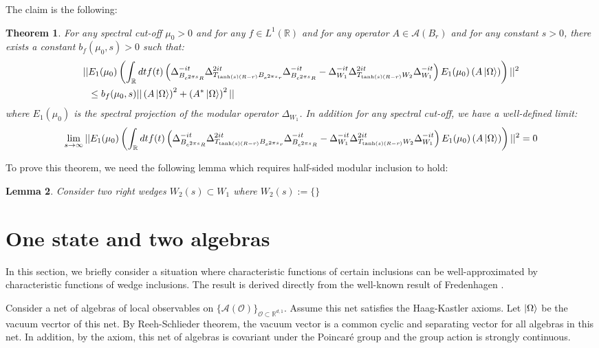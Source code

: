 \documentclass[a4paper,11pt]{article}
\newtheorem{theorem}{Theorem}
\newtheorem{lemma}[theorem]{Lemma}
\theoremstyle{definition}
\newcommand{\lb}{\left(}
\newcommand{\rb}{\right)}
\begin{document}
The claim is the following:
\begin{theorem}
    For any spectral cut-off $\mu_0 > 0$ and for any $f\in L^1(\mathbb{R})$ and for any operator $A\in\mathcal{A}(B_r)$ and for any constant $s > 0$, there exists a constant $b_f(\mu_0, s) >0$ such that:
    \begin{align}
        \begin{split}
            ||&E_1(\mu_0)\lb \int_\mathbb{R} dt f(t)\lb \Delta_{B_{e^{2\pi s}R}}^{-it}\Delta_{T_{\tanh(s)(R-r)}B_{e^{2\pi s}r}}^{2it}\Delta_{B_{e^{2\pi s}R}}^{-it} - \Delta_{W_1}^{-it}\Delta_{T_{\tanh(s)(R - r)}W_2}^{2it}\Delta_{W_1}^{-it} \rb E_1(\mu_0)\lb A\ket{\Omega}\rb \rb||^2 
            \\&
            \leq b_f(\mu_0, s)||\lb A\ket{\Omega}\rb^2 + \lb A^*\ket{\Omega} \rb^2||
        \end{split}
    \end{align}
    where $E_1(\mu_0)$ is the spectral projection of the modular operator $\Delta_{W_1}$. In addition for any spectral cut-off, we have a well-defined limit:
    \begin{align}
        \begin{split}
            \lim_{s\rightarrow\infty}||E_1(\mu_0)\lb \int_\mathbb{R} dt f(t)\lb \Delta_{B_{e^{2\pi s}R}}^{-it}\Delta_{T_{\tanh(s)(R-r)}B_{e^{2\pi s}r}}^{2it}\Delta_{B_{e^{2\pi s}R}}^{-it} - \Delta_{W_1}^{-it}\Delta_{T_{\tanh(s)(R - r)}W_2}^{2it}\Delta_{W_1}^{-it} \rb E_1(\mu_0)\lb A\ket{\Omega}\rb \rb||^2  = 0
        \end{split}
    \end{align}
\end{theorem}
To prove this theorem, we need the following lemma which requires half-sided modular inclusion to hold:
\begin{lemma}
    Consider two right wedges $W_2(s)\subset W_1$ where $W_2(s) := \{\}$
\end{lemma}
\section{One state and two algebras}
In this section, we briefly consider a situation where characteristic functions of certain inclusions can be well-approximated by characteristic functions of wedge inclusions. The result is derived directly from the well-known result of Fredenhagen \cite{fredenhagen}.

Consider a net of algebras of local observables on $\{\mathcal{A}(\mathcal{O})\}_{\mathcal{O}\subset\mathbb{R}^{d,1}}$. Assume this net satisfies the Haag-Kastler axioms. Let $\ket{\Omega}$ be the vacuum vecrtor of this net. By Reeh-Schlieder theorem, the vacuum vector is a common cyclic and separating vector for all algebras in this net. In addition, by the axiom, this net of algebras is covariant under the Poincaré group and the group action is strongly continuous.
\end{document}
